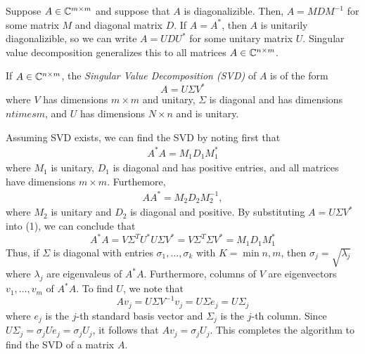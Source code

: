 \documentclass{article}
\begin{document}
\newpar
Suppose $A \in \mathbb{C}^{m \times m}$ and suppose that $A$ is diagonalizible. Then, $A = M D M^{-1}$ for some matrix $M$ and diagonal matrix $D$. If $A = A^*$, then $A$ is unitarily diagonalizible, so we can write $A = UDU^*$ for some unitary matrix $U$. Singular value decomposition generalizes this to all matrices $A \in \mathbb{C}^{n \times m}$.

\begin{definition}
    If $A \in \mathbb{C}^{n \times m}$, the \textit{Singular Value Decomposition (SVD)} of $A$ is of the form
        $$A = U \Sigma V^*$$
    where $V$ has dimensions $ m \times m$ and unitary, $\Sigma$ is diagonal and has dimensions $n times m$, and $U$ has dimensions $N \times n$ and is unitary.
\end{definition}

Assuming SVD exists, we can find the SVD by noting first that
    \begin{align}
        A^* A = M_1 D_1 M_1^*
    \end{align} 
where $M_1$ is unitary, $D_1$ is diagonal and has positive entries, and all matrices have dimensions $m \times m$. Furthemore, 
    \begin{align}
        AA^* = M_2 D_2 M_2^{-1},
    \end{align}
where $M_2$ is unitary and $D_2$ is diagonal and positive. By substituting $A = U \Sigma V^*$ into (1), we can conclude that 
    \[
        A^* A = V \Sigma^T U^* U \Sigma V^* = V \Sigma^T \Sigma V^* = M_1 D_1 M_1^*
    \]
Thus, if $\Sigma$ is diagonal with entries $\sigma_1, \hdots, \sigma_k$ with $K = \min{n, m}$, then $\sigma_j = \sqrt{\lambda_j}$ where $\lambda_j$ are eigenvaleus of $A^*A$. Furthermore, columns of $V$ are eigenvectors $v_1, \hdots, v_m$ of $A^* A$. To find $U$, we note that 
    \[
        Av_j = U \Sigma V^{-1} v_j = U \Sigma e_j = U \Sigma_j
    \]
where $e_j$ is the $j$-th standard basis vector and $\Sigma_j$ is the $j$-th column. Since $U \Sigma_j = \sigma_j U e_j = \sigma_j U_j$, it follows that $Av_j = \sigma_j U_j$. This completes the algorithm to find the SVD of a matrix $A$. 
\end{document}
